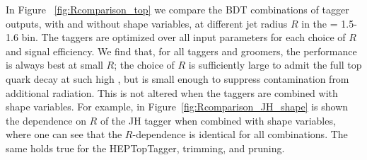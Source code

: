 %
%
%

In Figure ~\ref{fig:Rcomparison_top} we compare the BDT combinations of tagger outputs, with and without shape variables, at different jet radius $R$ in the \pt = 1.5-1.6 \TeV bin. The taggers are optimized over all input parameters for each choice of $R$ and signal efficiency. We find that, for all taggers and groomers, the performance is always best at small $R$; the choice of $R$ is sufficiently large to admit the full top quark decay at such high \pt, but is small enough to suppress contamination from additional radiation. This is not altered when the taggers are combined with shape variables. For example, in Figure~\ref{fig:Rcomparison_JH_shape} is shown the dependence on $R$ of the JH tagger when combined with shape variables, where one can see that the $R$-dependence is identical for all combinations. The same holds true for the HEPTopTagger, trimming, and pruning.

